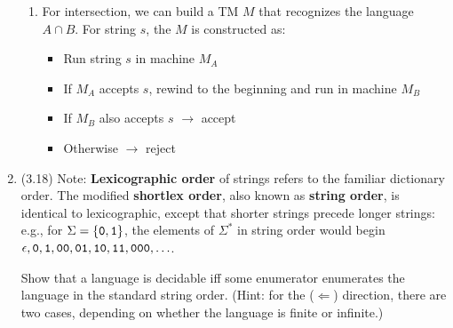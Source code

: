 \documentclass[11pt]{article}
\begin{document}
\begin{enumerate}
{\begin{enumerate}
\begin{enumerate}
        \item If $M_A$ accepts $s_1$ and $s_2=\epsilon$ $\to$ accept
        \item If $s_2$ is not empty, let $s_2$ be string $s$ in step i, repeat step i
        \item If $M_A$ rejects $s_1$ or loop forever $\to$ reject
    \end{enumerate}
    \item For intersection, we can build a TM $M$ that recognizes the language $A \cap B$. For string $s$, the $M$ is constructed as:
    \begin{itemize}
        \item Run string $s$ in machine $M_A$
        \item If $M_A$ accepts $s$, rewind to the beginning and run in machine $M_B$
        \item If $M_B$ also accepts $s$ $\to$ accept
        \item Otherwise $\to$ reject
    \end{itemize}
\end{enumerate}
}

\item (3.18)
Note: {\bf Lexicographic order} of strings refers to the familiar dictionary order. The modified {\bf shortlex order}, also known as {\bf string order}, is identical to lexicographic, except that shorter strings precede longer strings: e.g., for $\Sigma = \{{\tt 0},{\tt 1}\}$, the elements of $\Sigma^*$ in string order would begin $\epsilon, {\tt 0}, {\tt 1}, {\tt 00}, {\tt 01}, {\tt 10}, {\tt 11}, {\tt 000}, \ldots$.

Show that a language is decidable iff some enumerator enumerates the language in the standard string order. (Hint: for the ($\Leftarrow$) direction, there are two cases, depending on whether the language is finite or infinite.)


\end{enumerate}
\end{document}
